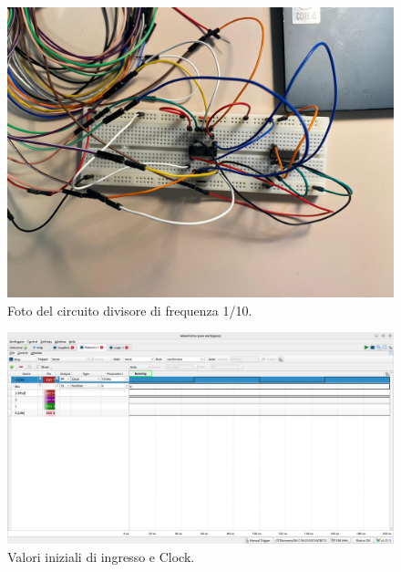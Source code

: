 \documentclass[10pt,a4paper]{article}
\begin{document}
\begin{figure}[htp]
\begin{center}
\includegraphics[scale=0.25]{circuito4.jpeg}
\caption{Foto del circuito divisore di frequenza 1/10.}
\end{center}
\end{figure}

\begin{figure}[htp]
\begin{center}
\includegraphics[scale=0.25]{fig5_1.png}
\caption{Valori iniziali di ingresso e Clock.}
\label{fig5_1}
\end{center}
\end{figure}
\end{document}
